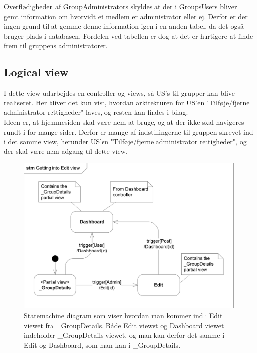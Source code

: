 \noindent Overflødigheden af GroupAdministrators skyldes at der i GroupsUsers bliver gemt information om hvorvidt et medlem er administrator eller ej. Derfor er der ingen grund til at gemme denne information igen i en anden tabel, da det også bruger plads i databasen. Fordelen ved tabellen er dog at det er hurtigere at finde frem til gruppens administratorer. \\

\subsection{Logical view}
I dette view udarbejdes en controller og views, så US’s til grupper kan blive realiseret. Her bliver det kun vist, hvordan arkitekturen for US’en "Tilføje/fjerne administrator rettigheder" laves, og resten kan findes i bilag.  \\

\noindent Ideen er, at hjemmesiden skal være nem at bruge, og at der ikke skal navigeres rundt i for mange sider. Derfor er mange af indstillingerne til gruppen skrevet ind i det samme view, herunder US’en "Tilføje/fjerne administrator rettigheder", og der skal være nem adgang til dette view.

\begin{figure}[H]
  \includegraphics[width=\linewidth]{01_Billeder/09_Arkitektur/Group/LogicalView_Add_Remove_Admin.png}
  \centering
  \caption{Statemachine diagram som viser hvordan man kommer ind i Edit viewet fra \_GroupDetails. Både Edit viewet og Dashboard viewet indeholder \_GroupDetails viewet, og man kan derfor det samme i Edit og Dashboard, som man kan i \_GroupDetails.}
  \label{fig:group_add_remove_admin}
\end{figure}

